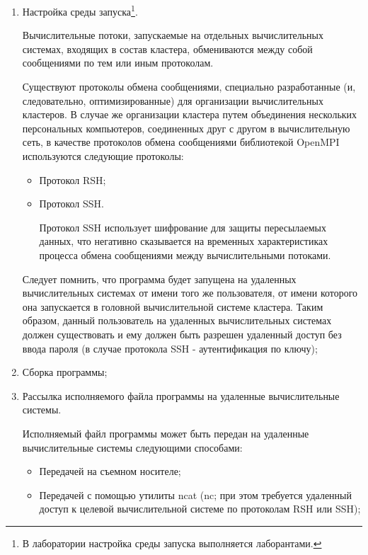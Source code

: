 \begin{enumerate}

	\item Настройка среды запуска\footnote{В лаборатории настройка среды запуска выполняется лаборантами.}.

	Вычислительные потоки, запускаемые на отдельных вычислительных системах, входящих в состав кластера, обмениваются между собой сообщениями по тем или иным протоколам.

	Существуют протоколы обмена сообщениями, специально разработанные (и, следовательно, оптимизированные) для организации вычислительных кластеров. В случае же организации кластера путем объединения нескольких персональных компьютеров, соединенных друг с другом в вычислительную сеть, в качестве протоколов обмена сообщениями библиотекой OpenMPI используются следующие протоколы:

	\begin{itemize}

		\item Протокол RSH;
		
		\item Протокол SSH.

			Протокол SSH использует шифрование для защиты пересылаемых данных, что негативно сказывается на временных характеристиках процесса обмена сообщениями между вычислительными потоками.

	\end{itemize}

	Следует помнить, что программа будет запущена на удаленных вычислительных системах от имени того же пользователя, от имени которого она запускается в головной вычислительной системе кластера. Таким образом, данный пользователь на удаленных вычислительных системах должен существовать и ему должен быть разрешен удаленный доступ без ввода пароля (в случае протокола SSH - аутентификация по ключу);

	\item Сборка программы;

	\item Рассылка исполняемого файла программы на удаленные вычислительные системы.

	Исполняемый файл программы может быть передан на удаленные вычислительные системы следующими способами:

	\begin{itemize}

		\item Передачей на съемном носителе;
		\item Передачей с помощью утилиты ncat (nc; при этом требуется удаленный доступ к целевой вычислительной системе по протоколам RSH или SSH);


\end{itemize}
\end{enumerate}
